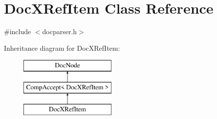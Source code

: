 \hypertarget{class_doc_x_ref_item}{}\section{Doc\+X\+Ref\+Item Class Reference}
\label{class_doc_x_ref_item}


{\ttfamily \#include $<$docparser.\+h$>$}

Inheritance diagram for Doc\+X\+Ref\+Item\+:\begin{figure}[H]
\begin{center}
\leavevmode
\includegraphics[height=3.000000cm]{class_doc_x_ref_item}
\end{center}
\end{figure}
